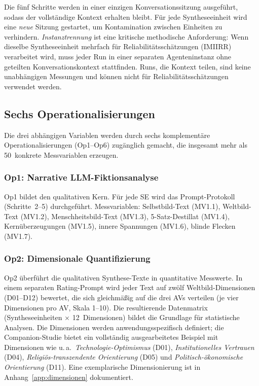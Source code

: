 \documentclass[11pt,a4paper]{article}
\theoremstyle{definition}
\theoremstyle{plain}
\theoremstyle{remark}
\begin{document}
Die f\"unf Schritte werden in einer einzigen Konversationssitzung ausgef\"uhrt, sodass der vollst\"andige Kontext erhalten bleibt. F\"ur jede Syntheseeinheit wird eine \emph{neue} Sitzung gestartet, um Kontamination zwischen Einheiten zu verhindern. \emph{Instanztrennung} ist eine kritische methodische Anforderung: Wenn dieselbe Syntheseeinheit mehrfach f\"ur Reliabilit\"atssch\"atzungen (IMIIRR) verarbeitet wird, muss jeder Run in einer separaten Agenteninstanz ohne geteilten Konversationskontext stattfinden. Runs, die Kontext teilen, sind keine unabh\"angigen Messungen und k\"onnen nicht f\"ur Reliabilit\"atssch\"atzungen verwendet werden.


\subsection{Sechs Operationalisierungen}
\label{sec:operationalisierungen}

Die drei abh\"angigen Variablen werden durch sechs komplement\"are Operationalisierungen (Op1--Op6) zug\"anglich gemacht, die insgesamt mehr als 50~konkrete Messvariablen erzeugen.

\subsubsection{Op1: Narrative LLM-Fiktionsanalyse}

Op1 bildet den qualitativen Kern. F\"ur jede SE wird das Prompt-Protokoll (Schritte~2--5) durchgef\"uhrt. Messvariablen: Selbstbild-Text (MV1.1), Weltbild-Text (MV1.2), Menschheitsbild-Text (MV1.3), 5-Satz-Destillat (MV1.4), Kern\"uberzeugungen (MV1.5), innere Spannungen (MV1.6), blinde Flecken (MV1.7).

\subsubsection{Op2: Dimensionale Quantifizierung}

Op2 \"uberf\"uhrt die qualitativen Synthese-Texte in quantitative Messwerte. In einem separaten Rating-Prompt wird jeder Text auf zw\"olf Weltbild-Dimensionen (D01--D12) bewertet, die sich gleichm\"a\ss{}ig auf die drei AVs verteilen (je vier Dimensionen pro AV, Skala 1--10). Die resultierende Datenmatrix (Syntheseeinheiten $\times$ 12~Dimensionen) bildet die Grundlage f\"ur statistische Analysen. Die Dimensionen werden anwendungsspezifisch definiert; die Companion-Studie \citep{Geiger2026Elite} bietet ein vollst\"andig ausgearbeitetes Beispiel mit Dimensionen wie u.\,a.\ \emph{Technologie-Optimismus} (D01), \emph{Institutionelles Vertrauen} (D04), \emph{Religi\"os-transzendente Orientierung} (D05) und \emph{Politisch-\"okonomische Orientierung} (D11). Eine exemplarische Dimensionierung ist in Anhang~\ref{app:dimensionen} dokumentiert.
\end{document}
